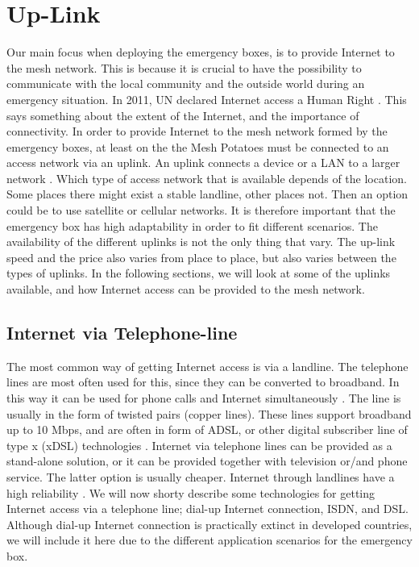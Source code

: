 \section{Up-Link}
Our main focus when deploying the emergency boxes, is to provide Internet to the mesh network. This is because it is crucial to have the possibility to communicate with the local community and the outside world during an emergency situation. In 2011, UN declared Internet access a Human Right \cite{HR}. This says something about the extent of the Internet, and the importance of connectivity. In order to provide Internet to the mesh network formed by the emergency boxes, at least on the the Mesh Potatoes must be connected to an access network via an uplink. An uplink connects a device or a LAN to a larger network \cite{uplink}. Which type of access network that is available depends of the location. Some places there might exist a stable landline, other places not. Then an option could be to use satellite or cellular networks. It is therefore important that the emergency box has high adaptability in order to fit different scenarios. The availability of the different uplinks is not the only thing that vary. The up-link speed and the price also varies from place to place, but also varies between the types of uplinks. In the following sections, we will look at some of the uplinks available, and how Internet access can be provided to the mesh network.  


\subsection{Internet via Telephone-line}
The most common way of getting Internet access is via a landline. The telephone lines are most often used for this, since they can be converted to broadband. In this way it can be used for phone calls and Internet simultaneously \cite{internet}. The line is usually in the form of twisted pairs (copper lines). These lines support broadband up to 10 Mbps, and are often in form of ADSL, or other digital subscriber line of type x (xDSL) technologies \citep{audestad}. Internet via telephone lines can be provided as a stand-alone solution, or it can be provided together with television or/and phone service. The latter option is usually cheaper. Internet through landlines have a high reliability \cite{cablevssatellite}. We will now shorty describe some technologies for getting Internet access via a telephone line; dial-up Internet connection, ISDN, and DSL. Although dial-up Internet connection is practically extinct in developed countries, we will include it here due to the different application scenarios for the emergency box. 

